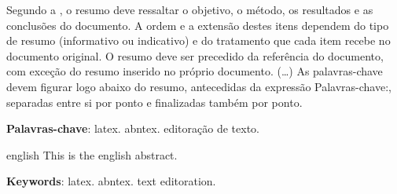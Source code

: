 
\setlength{\absparsep}{18pt} %
\begin{resumo}
	Segundo a \cite{cisco-forecast}, o resumo deve ressaltar o
	objetivo, o método, os resultados e as conclusões do documento. A ordem e a extensão
	destes itens dependem do tipo de resumo (informativo ou indicativo) e do
	tratamento que cada item recebe no documento original. O resumo deve ser
	precedido da referência do documento, com exceção do resumo inserido no
	próprio documento. (\ldots) As palavras-chave devem figurar logo abaixo do
	resumo, antecedidas da expressão Palavras-chave:, separadas entre si por
	ponto e finalizadas também por ponto.
	
	\textbf{Palavras-chave}: latex. abntex. editoração de texto.
\end{resumo}

\begin{resumo}[Abstract]
	\begin{otherlanguage*}{english}
		This is the english abstract.
		
		\vspace{\onelineskip}
		
		\noindent 
		\textbf{Keywords}: latex. abntex. text editoration.
	\end{otherlanguage*}
\end{resumo}